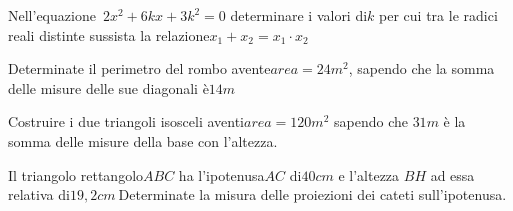 \begin{esercizio}
 \label{ese:3.80}
Nell'equazione~\(2 x^{2} + 6 k x + 3 k^{2} = 0\) determinare i valori di\(k\) 
per 
cui tra le radici reali distinte sussista la relazione\(x_{1} + x_{2} = 
x_{1} 
\cdot x_{2}\)
\end{esercizio}

\begin{esercizio}
 \label{ese:3.81}
Determinate il perimetro del rombo avente\(area = 24\unit{m^{2}}\), sapendo 
che 
la somma delle misure delle sue diagonali è\(14\unit{m}\)
\end{esercizio}

\begin{esercizio}
\label{ese:3.82}
Costruire i due triangoli isosceli aventi\(area = 120\unit{m^{2}}\) sapendo 
che 
\(31\unit{m}\) è la somma delle misure della base con l'altezza.
\end{esercizio}

\begin{esercizio}
 \label{ese:3.83}
Il triangolo rettangolo\(ABC\) ha l'ipotenusa\(AC\) di\(40\unit{cm}\) e l'altezza 
\(BH\) ad essa relativa di\(19,2\unit{cm}~\)Determinate la misura delle 
proiezioni 
dei cateti sull'ipotenusa.
\end{esercizio}


